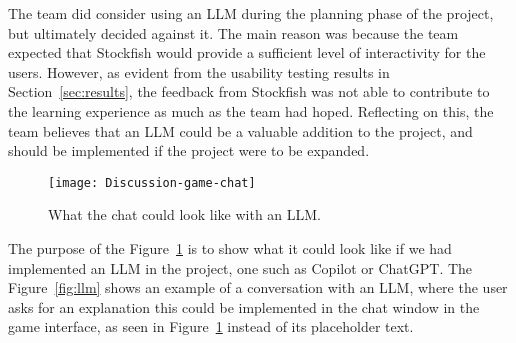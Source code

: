 The team did consider using an LLM during the planning phase of the project, but ultimately decided against it.
The main reason was because the team expected that Stockfish would provide a sufficient level of interactivity for the
users.
However, as evident from the usability testing results in Section~\ref{sec:results}, the feedback from Stockfish was
not able to contribute to the learning experience as much as the team had hoped.
Reflecting on this, the team believes that an LLM could be a valuable addition to the project, and should be implemented
if the project were to be expanded.

\begin{figure}[H]
    \centering
    \texttt{[image: Discussion-game-chat]}
    \caption{What the chat could look like with an LLM.}\label{fig:Discussion-game-chat}
\end{figure}

The purpose of the Figure~\ref{fig:Discussion-game-chat} is
to show what it could look like if we had implemented an LLM in the project, one such as Copilot or ChatGPT\@.
The Figure~\ref{fig:llm} shows an example of a conversation with an LLM, where the user asks for an explanation
this could be implemented in the chat window in the game interface, as seen in Figure~\ref{fig:Discussion-game-chat}
instead of its placeholder text.
